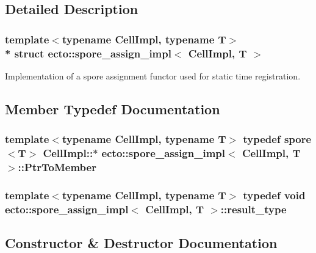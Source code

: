 \subsection{Detailed Description}
\subsubsection*{template$<$typename Cell\+Impl, typename T$>$\\*
struct ecto\+::spore\+\_\+assign\+\_\+impl$<$ Cell\+Impl, T $>$}

Implementation of a spore assignment functor used for static time registration. 

\subsection{Member Typedef Documentation}
\subsubsection[{\texorpdfstring{Ptr\+To\+Member}{PtrToMember}}]{\setlength{\rightskip}{0pt plus 5cm}template$<$typename Cell\+Impl, typename T$>$ typedef {\bf spore}$<$T$>$ Cell\+Impl\+::$\ast$ {\bf ecto\+::spore\+\_\+assign\+\_\+impl}$<$ Cell\+Impl, T $>$\+::{\bf Ptr\+To\+Member}}\hypertarget{structecto_1_1spore__assign__impl_a374a7ffdead1191878d49a6ef295ada6}{}\label{structecto_1_1spore__assign__impl_a374a7ffdead1191878d49a6ef295ada6}
\subsubsection[{\texorpdfstring{result\+\_\+type}{result_type}}]{\setlength{\rightskip}{0pt plus 5cm}template$<$typename Cell\+Impl, typename T$>$ typedef void {\bf ecto\+::spore\+\_\+assign\+\_\+impl}$<$ Cell\+Impl, T $>$\+::{\bf result\+\_\+type}}\hypertarget{structecto_1_1spore__assign__impl_a4947968d387bce16aab17acdfd094019}{}\label{structecto_1_1spore__assign__impl_a4947968d387bce16aab17acdfd094019}


\subsection{Constructor \& Destructor Documentation}
